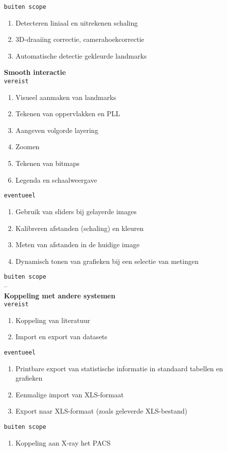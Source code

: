 \verb!buiten scope!
\begin{enumerate}
	\item Detecteren liniaal en uitrekenen schaling
	\item 3D-draaiing correctie, camerahoekcorrectie
	\item Automatische detectie gekleurde landmarks\\
\end{enumerate}
\Large{\textbf{Smooth interactie}}
\\\verb!vereist!
\begin{enumerate}
	\item Visueel aanmaken van landmarks
	\item Tekenen van oppervlakken en PLL
	\item Aangeven volgorde layering
	\item Zoomen
	\item Tekenen van bitmaps
	\item Legenda en schaalweergave
\end{enumerate}
\verb!eventueel!
\begin{enumerate}
	\item Gebruik van sliders bij gelayerde images
	\item Kalibreren afstanden (schaling) en kleuren
	\item Meten van afstanden in de huidige image
	\item Dynamisch tonen van grafieken bij een selectie van metingen
\end{enumerate}
\verb!buiten scope!\\
--\\
\Large{\textbf{Koppeling met andere systemen}}
\\\verb!vereist!
\begin{enumerate}
	\item Koppeling van literatuur
	\item Import en export van datasets
\end{enumerate}
\verb!eventueel!
\begin{enumerate}
	\item Printbare export van statistische informatie in standaard tabellen en grafieken
	\item Eenmalige import van XLS-formaat
	\item Export naar XLS-formaat (zoals geleverde XLS-bestand)
\end{enumerate}
\verb!buiten scope!
\begin{enumerate}
	\item Koppeling aan X-ray het PACS
\end{enumerate}
\newpage

